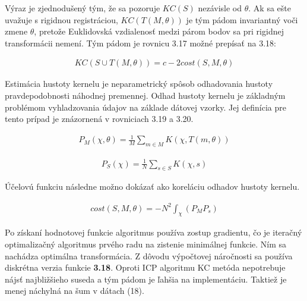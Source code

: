 Výraz je zjednodušený tým, že sa pozoruje $KC\left(S\right)$ nezávisle od $\theta$. Ak sa ešte uvažuje s rigidnou registráciou, $KC\left(T \left(M, \theta \right)\right)$ je tým pádom invariantný voči zmene $\theta$, pretože Euklidovská vzdialenosť medzi párom bodov sa pri rigidnej transformácii nemení. Tým pádom je rovnicu 3.17 možné prepísať na 3.18:

\begin{equation}
\label{eq18}
\begin{aligned}
KC\left(S\cup T\left(M,\theta\right)\right) = c - 2cost\left(S,M,\theta \right)
\end{aligned}
\end{equation}


Estimácia hustoty kernelu je neparametrický spôsob odhadovania hustoty pravdepodobnosti náhodnej premennej. Odhad hustoty kernelu je základným problémom vyhladzovania údajov na základe dátovej vzorky. Jej definícia pre tento prípad je znázornená v rovniciach 3.19 a 3.20.

\begin{equation}
\label{eq19}
\begin{aligned}
P_M\left( \chi,\theta\right)=\frac{1}{M}\sum_{m\in M} K\left(\chi,T\left(m,\theta\right)\right)
\end{aligned}
\end{equation}

\begin{equation}
\label{eq20}
\begin{aligned}
P_S\left( \chi\right)=\frac{1}{N}\sum_{s\in S} K\left(\chi,s\right)
\end{aligned}
\end{equation}

Účelovú funkciu následne možno dokázať ako koreláciu odhadov hustoty kernelu.

\begin{equation}
\label{eq21}
\begin{aligned}
cost\left(S,M,\theta\right)= - N^2 \int_{\chi} \left(P_M P_s\right)
\end{aligned}
\end{equation}

Po získaní hodnotovej funkcie algoritmus používa zostup gradientu, čo je iteračný optimalizačný algoritmus prvého radu na zistenie minimálnej funkcie. Ním sa nachádza optimálna transformácia. Z dôvodu výpočtovej náročnosti sa používa diskrétna verzia funkcie\textbf{ 3.18}. Oproti ICP algoritmu KC metóda nepotrebuje nájsť najbližšieho suseda a tým pádom je ľahšia na implementáciu. Taktiež je menej náchylná na šum v dátach (18).

